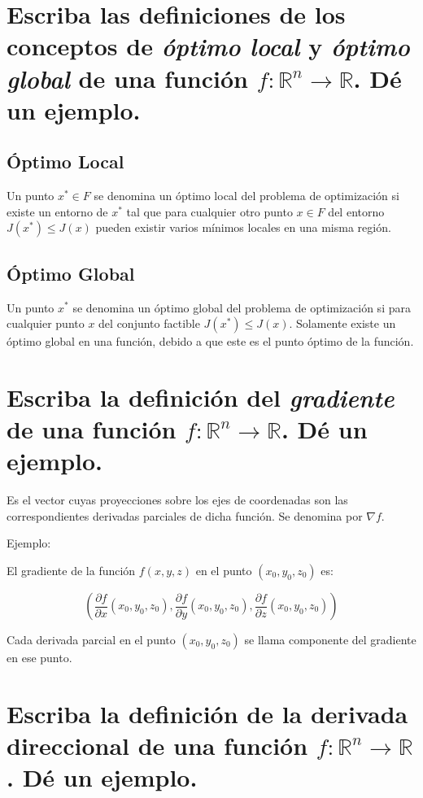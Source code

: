 \documentclass[12pt,oneside]{book}
\begin{document}
\section[Óptimo Local y Global $\mathbb{R}^n$]{Escriba las definiciones de los conceptos de \textit{óptimo local} y \textit{óptimo global}
de una función $f: \mathbb{R}^n \rightarrow \mathbb{R}$. Dé un ejemplo.}

\subsection{Óptimo Local}
Un punto $x^* \in F$ se denomina un óptimo local del problema de optimización si
existe un entorno de $x^*$ tal que para cualquier otro punto $x \in F$ del entorno $J(x^*) \leq J(x)$ pueden existir varios mínimos locales en una misma región.

\subsection{Óptimo Global}
Un punto $x^*$ se denomina un óptimo global del problema de optimización si para cualquier punto $x$ del conjunto factible  $J(x^*) \leq J(x)$. Solamente existe un óptimo global en una función, debido a que este es el punto óptimo de la función.

\section[Gradiente de una función]{Escriba la definición del \textit{gradiente} de una función $f: \mathbb{R}^n \rightarrow \mathbb{R}$. Dé un
ejemplo.}

Es el vector cuyas proyecciones sobre los ejes de coordenadas son las correspondientes derivadas parciales de dicha función. Se denomina por $\nabla f$.

Ejemplo:

El gradiente de la función $f(x,y,z)$ en el punto $(x_0,y_0,z_0)$ es:

\begin{equation*}
    \left(\frac{\partial f}{\partial x} (x_0,y_0,z_0), \frac{\partial f}{\partial y}(x_0,y_0,z_0), \frac{\partial f}{\partial z}(x_0,y_0,z_0)\right)
\end{equation*}

Cada derivada parcial en el punto $(x_0,y_0,z_0)$ se llama componente del gradiente en ese punto.

\section[Derivada Direccional]{Escriba la definición de la derivada direccional de una función $f: \mathbb{R}^n \rightarrow \mathbb{R}$.
Dé un ejemplo.}
\end{document}
